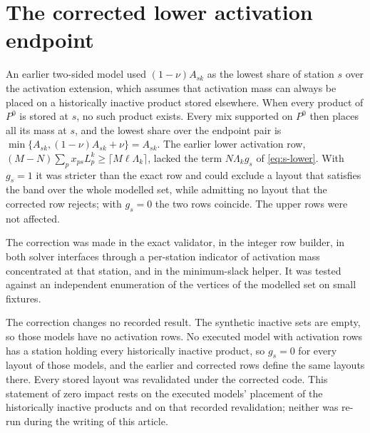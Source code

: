 \documentclass[11pt]{article}
\begin{document}
\section{The corrected lower activation endpoint}\label{sec:s-trapped}
An earlier two-sided model used $(1-\nu)A_{sk}$ as the lowest share of station $s$ over the activation extension, which assumes that activation mass can always be placed on a historically inactive product stored elsewhere. When every product of $P^0$ is stored at $s$, no such product exists. Every mix supported on $P^0$ then places all its mass at $s$, and the lowest share over the endpoint pair is $\min\{A_{sk},(1-\nu)A_{sk}+\nu\}=A_{sk}$. The earlier lower activation row, $(M-N)\sum_px_{ps}L^k_p\ge\lceil M\ell\Lambda_k\rceil$, lacked the term $N\Lambda_kg_s$ of \eqref{eq:s-lower}. With $g_s=1$ it was stricter than the exact row and could exclude a layout that satisfies the band over the whole modelled set, while admitting no layout that the corrected row rejects; with $g_s=0$ the two rows coincide. The upper rows were not affected.

The correction was made in the exact validator, in the integer row builder, in both solver interfaces through a per-station indicator of activation mass concentrated at that station, and in the minimum-slack helper. It was tested against an independent enumeration of the vertices of the modelled set on small fixtures.

The correction changes no recorded result. The synthetic inactive sets are empty, so those models have no activation rows. No executed model with activation rows has a station holding every historically inactive product, so $g_s=0$ for every layout of those models, and the earlier and corrected rows define the same layouts there. Every stored layout was revalidated under the corrected code. This statement of zero impact rests on the executed models' placement of the historically inactive products and on that recorded revalidation; neither was re-run during the writing of this article.

\end{document}
